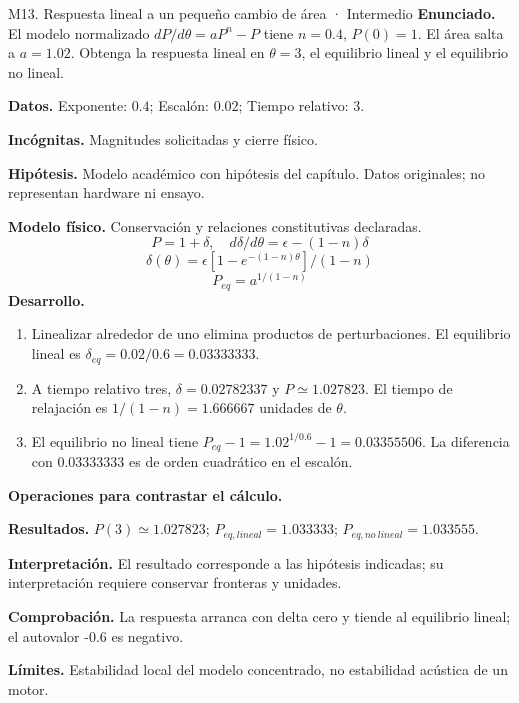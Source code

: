 \begin{studiumworked}{M13. Respuesta lineal a un pequeño cambio de área · Intermedio}
\textbf{Enunciado.} El modelo normalizado $dP/d\theta=aP^n-P$ tiene $n=0.4$, $P(0)=1$. El área salta a $a=1.02$. Obtenga la respuesta lineal en $\theta=3$, el equilibrio lineal y el equilibrio no lineal.

\textbf{Datos.} Exponente: $0.4$; Escalón: $0.02$; Tiempo relativo: $3$.

\textbf{Incógnitas.} Magnitudes solicitadas y cierre físico.

\textbf{Hipótesis.} Modelo académico con hipótesis del capítulo. Datos originales; no representan hardware ni ensayo.

\textbf{Modelo físico.} Conservación y relaciones constitutivas declaradas.
\[P=1+\delta,\quad d\delta/d\theta=\epsilon-(1-n)\delta\]
\[\delta(\theta)=\epsilon[1-e^{-(1-n)\theta}]/(1-n)\]
\[P_{eq}=a^{1/(1-n)}\]
\textbf{Desarrollo.}
\begin{enumerate}
\item Linealizar alrededor de uno elimina productos de perturbaciones. El equilibrio lineal es $\delta_{eq}=0.02/0.6=0.03333333$.
\item A tiempo relativo tres, $\delta=0.02782337$ y $P\simeq1.027823$. El tiempo de relajación es $1/(1-n)=1.666667$ unidades de $\theta$.
\item El equilibrio no lineal tiene $P_{eq}-1=1.02^{1/0.6}-1=0.03355506$. La diferencia con $0.03333333$ es de orden cuadrático en el escalón.
\end{enumerate}
\textbf{Operaciones para contrastar el cálculo.}

\textbf{Resultados.} $P(3)\simeq1.027823$; $P_{eq,lineal}=1.033333$; $P_{eq,no\ lineal}=1.033555$.

\textbf{Interpretación.} El resultado corresponde a las hipótesis indicadas; su interpretación requiere conservar fronteras y unidades.

\textbf{Comprobación.} La respuesta arranca con delta cero y tiende al equilibrio lineal; el autovalor -0.6 es negativo.

\textbf{Límites.} Estabilidad local del modelo concentrado, no estabilidad acústica de un motor.
\end{studiumworked}
